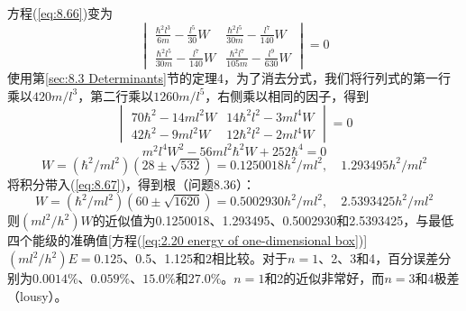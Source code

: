 \begin{examplebox}
        方程(\ref{eq:8.66})变为
        \begin{equation}
            \begin{vmatrix}
                \frac{\hbar^2 l^3}{6m} - \frac{l^5}{30}W & \frac{\hbar^2 l^5}{30m} - \frac{l^7}{140}W \\
                \frac{\hbar^2 l^5}{30m} - \frac{l^7}{140}W & \frac{\hbar^2 l^7}{105m} - \frac{l^9}{630}W
            \end{vmatrix} = 0
            \label{eq:8.70}
        \end{equation}
        使用第\ref{sec:8.3 Determinants}节的定理4，为了消去分式，我们将行列式的第一行乘以$420m/l^3$，第二行乘以$1260m/l^5$，右侧乘以相同的因子，得到
        \begin{equation*}
            \begin{vmatrix}
                70\hbar^2 - 14ml^2W & 14\hbar^2 l^2 - 3ml^4W \\
                42\hbar^2 - 9ml^2W & 12\hbar^2  l^2 - 2ml^4W
            \end{vmatrix} = 0
        \end{equation*}
        \begin{equation*}
            m^2l^4W^2 - 56ml^2\hbar^2W + 252\hbar^4 = 0
        \end{equation*}
        \begin{equation}
            W = \left(\hbar^2/ml^2\right)\left(28 \pm \sqrt{532}\right) = 0.1250018h^2/ml^2, \quad 1.293495h^2/ml^2
            \label{eq:8.71}
        \end{equation}
        将积分带入(\ref{eq:8.67})，得到根（问题8.36）：
        \begin{equation}
            W = \left(\hbar^2/ml^2\right)\left(60 \pm \sqrt{1620}\right) = 0.5002930h^2/ml^2, \quad 2.5393425h^2/ml^2
            \label{eq:8.72}
        \end{equation}
        则$\left(ml^2/h^2\right)W$的近似值为0.1250018、1.293495、0.5002930和2.5393425，与最低四个能级的准确值[方程(\ref{eq:2.20 energy of one-dimensional box})]$\left(ml^2/h^2\right)E = 0.125$、0.5、1.125和$2$相比较。对于$n=1$、2、3和4，百分误差分别为$0.0014\%$、$0.059\%$、$15.0\%$和$27.0\%$。$n=1$和2的近似非常好，而$n=3$和4极差（lousy）。


\end{examplebox}
